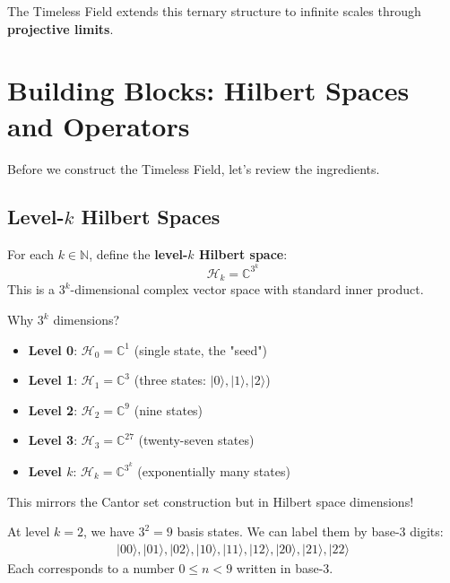 The Timeless Field extends this ternary structure to infinite scales through \textbf{projective limits}.

\section{Building Blocks: Hilbert Spaces and Operators}
\label{sec:building-blocks}

Before we construct the Timeless Field, let's review the ingredients.

\subsection{Level-$k$ Hilbert Spaces}

\begin{defn}\label{def:level-k-hilbert}
For each $k \in \mathbb{N}$, define the \textbf{level-$k$ Hilbert space}:
\begin{equation}
\mathcal{H}_k = \mathbb{C}^{3^k}
\end{equation}
This is a $3^k$-dimensional complex vector space with standard inner product.
\end{defn}

\begin{intuitive}
Why $3^k$ dimensions?
\begin{itemize}
\item \textbf{Level 0}: $\mathcal{H}_0 = \mathbb{C}^1$ (single state, the "seed")
\item \textbf{Level 1}: $\mathcal{H}_1 = \mathbb{C}^3$ (three states: $|0\rangle, |1\rangle, |2\rangle$)
\item \textbf{Level 2}: $\mathcal{H}_2 = \mathbb{C}^9$ (nine states)
\item \textbf{Level 3}: $\mathcal{H}_3 = \mathbb{C}^{27}$ (twenty-seven states)
\item \textbf{Level $k$}: $\mathcal{H}_k = \mathbb{C}^{3^k}$ (exponentially many states)
\end{itemize}

This mirrors the Cantor set construction but in Hilbert space dimensions!
\end{intuitive}

\begin{example}
At level $k=2$, we have $3^2 = 9$ basis states. We can label them by base-3 digits:
\begin{align*}
|00\rangle, |01\rangle, |02\rangle, |10\rangle, |11\rangle, |12\rangle, |20\rangle, |21\rangle, |22\rangle
\end{align*}
Each corresponds to a number $0 \leq n < 9$ written in base-3.
\end{example}

